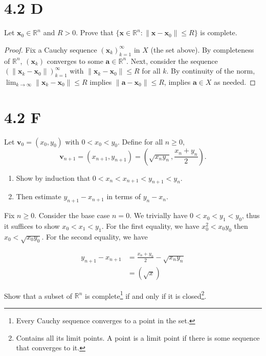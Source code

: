 \documentclass[../main.tex]{subfiles}
\begin{document}
\section{4.2 D}
\begin{problem}
    Let $\mathbf{x}_0 \in \mathbb{R}^n$ and $R > 0$.
    Prove that $\{ \mathbf{x} \in \mathbb{R}^n : \|\mathbf{x} - \mathbf{x}_0\| \le R \}$ is complete.
\end{problem}
\begin{proof}
    Fix a Cauchy sequence $(\mathbf{x}_k)_{k = 1}^\infty$ in $X$ (the set above).
    By completeness of $\mathbb{R}^n$, $(\mathbf{x}_k)$ converges to some $\mathbf{a} \in \mathbb{R}^n$.
    Next, consider the sequence $(\| \mathbf{x}_k - \mathbf{x}_0 \|)_{k = 1}^\infty$ with $\| \mathbf{x}_k - \mathbf{x}_0 \| \le R$ for all $k$.
    By continuity of the norm, $\lim_{k \to \infty} \| \mathbf{x}_k - \mathbf{x}_0 \| \le R$ implies $\| \mathbf{a} - \mathbf{x}_0 \| \le R$, implies $\mathbf{a} \in X$ as needed.
\end{proof}

\section{4.2 F}
\begin{problem}
    Let $\mathbf{v}_0 = (x_0, y_0)$ with $0 < x_0 < y_0$.
    Define for all $n \ge 0$,
    \[
        \mathbf{v}_{n + 1} = (x_{n + 1}, y_{n + 1}) = \left(\sqrt{x_n y_n}, \frac{x_n + y_n}{2}\right).
    \]
    \begin{enumerate}[label=(\alph*)]
        \item Show by induction that $0 < x_n < x_{n + 1} < y_{n + 1} < y_n$.
        \item Then estimate $y_{n + 1} - x_{n + 1}$ in terms of $y_n - x_n$.
    \end{enumerate}
\end{problem}
Fix $n \ge 0$.
Consider the base case $n = 0$.
We trivially have $0 < x_0 < y_1 < y_0$, thus it suffices to show $x_0 < x_1 < y_1$.
For the first equality, we have $x_0^2 < x_0 y_0$ then $x_0 < \sqrt{x_0 y_0}$.
For the second equality, we have 

\begin{align*}
    y_{n + 1} - x_{n + 1} &= \frac{x_n + y_n}{2} - \sqrt{x_n y_n} \\
                          &= (\sqrt{x} )
\end{align*}

\begin{problem}[\S4.3 H]
    Show that a subset of $\mathbb{R}^n$ is complete\footnote{Every Cauchy sequence converges to a point in the set.}
    if and only if it is closed\footnote{Contains all its limit points. A point is a limit point if there is some sequence that converges to it.}.
\end{problem}
\end{document}
